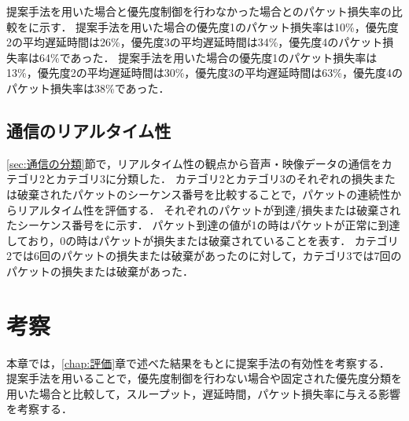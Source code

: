\documentclass[a4paper,11pt,uplatex]{ujreport}
\begin{document}

  提案手法を用いた場合と優先度制御を行わなかった場合とのパケット損失率の比較をに示す．
  提案手法を用いた場合の優先度1のパケット損失率は10\%，優先度2の平均遅延時間は26\%，優先度3の平均遅延時間は34\%，優先度4のパケット損失率は64\%であった．
  提案手法を用いた場合の優先度1のパケット損失率は13\%，優先度2の平均遅延時間は30\%，優先度3の平均遅延時間は63\%，優先度4のパケット損失率は38\%であった．


\section{通信のリアルタイム性}
\label{sec:通信のリアルタイム性}

  \ref{sec:通信の分類}節で，リアルタイム性の観点から音声・映像データの通信をカテゴリ2とカテゴリ3に分類した．
  カテゴリ2とカテゴリ3のそれぞれの損失または破棄されたパケットのシーケンス番号を比較することで，パケットの連続性からリアルタイム性を評価する．
  それぞれのパケットが到達/損失または破棄されたシーケンス番号をに示す．
  パケット到達の値が1の時はパケットが正常に到達しており，0の時はパケットが損失または破棄されていることを表す．
  カテゴリ2では6回のパケットの損失または破棄があったのに対して，カテゴリ3では7回のパケットの損失または破棄があった．



\chapter{考察}
\label{chap:考察}

  本章では，\ref{chap:評価}章で述べた結果をもとに提案手法の有効性を考察する．
  提案手法を用いることで，優先度制御を行わない場合や固定された優先度分類を用いた場合と比較して，スループット，遅延時間，パケット損失率に与える影響を考察する．\par
\end{document}

